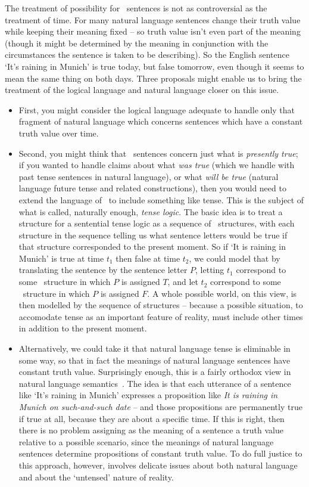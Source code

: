 The treatment of possibility for \lone\ sentences is not as controversial as the treatment of time. For many natural language sentences change their truth value while keeping their meaning fixed – so truth value isn't even part of the meaning (though it might be determined by the meaning in conjunction with the circumstances the sentence is taken to be describing). So the English sentence `It's raining in Munich' is true today, but false tomorrow, even though it seems to mean the same thing on both days. Three proposals might enable us to bring the treatment of the logical language and natural language closer on this issue. \begin{itemize}
	\item First, you might consider the logical language adequate to handle only that fragment of natural language which concerns sentences which have a constant truth value over time. 
	\item Second, you might think that \lone\ sentences concern just what is \emph{presently true}; if you wanted to handle claims about what \emph{was true} (which we handle with past tense sentences in natural language), or what \emph{will be true} (natural language future tense and related constructions), then you would need to extend the language of \lone\ to include something like tense. This is the subject of what is called, naturally enough, \emph{tense logic}. The basic idea is to treat a structure for a sentential tense logic as a  sequence of \lone\ structures, with each structure in the sequence telling us what sentence letters would be true if that structure corresponded to the present moment. So if ‘It is raining in Munich’ is true at time $t_{1}$ then false at time $t_{2}$, we could model that by translating the sentence by the sentence letter $P$, letting $t_{1}$ correspond to some \lone\ structure in which $P$ is assigned $T$, and let $t_{2}$ correspond to some \lone\ structure in which $P$ is assigned $F$. A whole possible world, on this view, is then modelled by the sequence of structures – because a possible situation, to accomodate tense as an important feature of reality, must include other times in addition to the present moment. 
	\item Alternatively, we could take it that natural language tense is eliminable in some way, so that in fact the meanings of natural language sentences have constant truth value. Surprisingly enough, this is a fairly orthodox view in natural language semantics~\citep{king,partee}. The idea is that each utterance of a sentence like ‘It's raining in Munich’ expresses a proposition like \emph{It is raining in Munich on such-and-such date} – and those propositions are permanently true if true at all, because they are about a specific time. If this is right, then there is no problem assigning as the meaning of a sentence a truth value relative to a possible scenario, since the meanings of natural language sentences determine propositions of constant truth value. To do full justice to this approach, however, involves delicate issues about both natural language and about the `untensed' nature of reality. 

\end{itemize}
